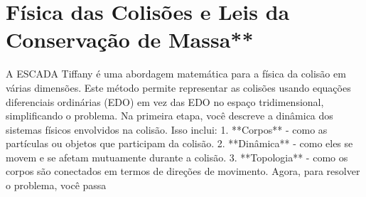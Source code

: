 \documentclass[11pt,a4paper]{article}
\begin{document}
\section{Física das Colisões e Leis da Conservação de Massa**}
A ESCADA Tiffany é uma abordagem matemática para a física da colisão em várias dimensões. Este método permite representar as colisões usando equações diferenciais ordinárias (EDO) em vez das EDO no espaço tridimensional, simplificando o problema. Na primeira etapa, você descreve a dinâmica dos sistemas físicos envolvidos na colisão. Isso inclui: 1. **Corpos** - como as partículas ou objetos que participam da colisão. 2. **Dinâmica** - como eles se movem e se afetam mutuamente durante a colisão. 3. **Topologia** - como os corpos são conectados em termos de direções de movimento. Agora, para resolver o problema, você passa
\end{document}
